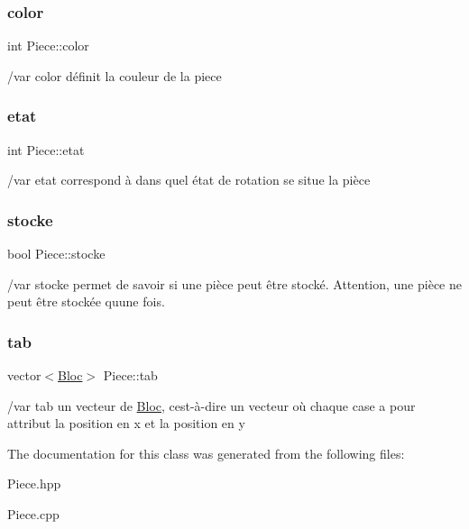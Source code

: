 \subsubsection{\texorpdfstring{color}{color}}
{\footnotesize\ttfamily int Piece\+::color\hspace{0.3cm}{\ttfamily [protected]}}

/var color définit la couleur de la piece \mbox{\label{classPiece_a9632e25aa0e79f8161451a937ccfc7ad}} 
\subsubsection{\texorpdfstring{etat}{etat}}
{\footnotesize\ttfamily int Piece\+::etat\hspace{0.3cm}{\ttfamily [protected]}}

/var etat correspond à dans quel état de rotation se situe la pièce \mbox{\label{classPiece_af0c815c20f2000c02b6d7ce5b6703651}} 
\subsubsection{\texorpdfstring{stocke}{stocke}}
{\footnotesize\ttfamily bool Piece\+::stocke\hspace{0.3cm}{\ttfamily [protected]}}

/var stocke permet de savoir si une pièce peut être stocké. Attention, une pièce ne peut être stockée qu\textquotesingle{}une fois. \mbox{\label{classPiece_a9ea65e906b9ef0c30594f4f5aa5ed444}} 
\subsubsection{\texorpdfstring{tab}{tab}}
{\footnotesize\ttfamily vector$<$\hyperlink{classBloc}{Bloc}$>$ Piece\+::tab\hspace{0.3cm}{\ttfamily [protected]}}

/var tab un vecteur de \hyperlink{classBloc}{Bloc}, c\textquotesingle{}est-\/à-\/dire un vecteur où chaque case a pour attribut la position en x et la position en y 

The documentation for this class was generated from the following files\+:\begin{DoxyCompactItemize}
\item 
Piece.\+hpp\item 
Piece.\+cpp\end{DoxyCompactItemize}
